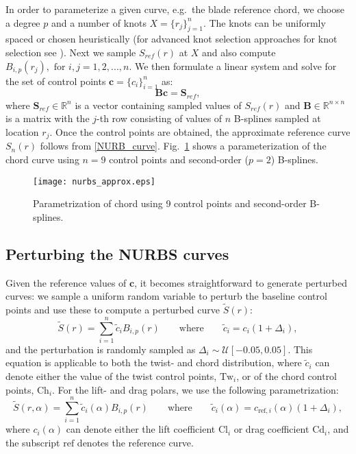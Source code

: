 In order to parameterize a given curve, e.g.\ the blade reference chord, we choose a degree $p$ and a number of knots $X =\{r_j\}_{j=1}^n$. The knots can be uniformly spaced or chosen heuristically (for advanced knot selection approaches for knot selection see \cite{Li2005}). Next we sample $S_{ref}(r)$ at $X$ and also compute $B_{i,p}(r_j), \text{ for }i, j = 1,2, ..., n$. We then formulate a linear system and solve for the set of control points $\mathbf{c}=\{c_i\}_{i=1}^n$ as:
\begin{equation}\label{nurbs_inversion}
\mathbf{B}\mathbf{c} = \mathbf{S}_{ref},
\end{equation}
where $\mathbf{S}_{ref}\in\mathbb{R}^{n}$ is a vector containing sampled values of $S_{ref}(r)$ and $\mathbf{B}\in \mathbb{R}^{n\times n}$ is a matrix with the $j$-th row consisting of values of $n$ B-splines sampled at location $r_j$. Once the control points are obtained, the approximate reference curve $S_n(r)$ follows from \eqref{NURB_curve}. Fig.~\ref{nurbs_approx} shows a parameterization of the chord curve using $n=9$ control points and second-order ($p=2$) B-splines.
\begin{figure}[h!]
\centering
\texttt{[image: nurbs\_approx.eps]}
\caption{Parametrization of chord using 9 control points and second-order B-splines.}
\label{nurbs_approx}
\end{figure}

\subsection{Perturbing the NURBS curves}
Given the reference values of $\mathbf{c}$, it becomes straightforward to generate perturbed curves: we sample a uniform random variable to perturb the baseline control points and use these to compute a perturbed curve $\tilde{S}(r)$:
\begin{equation}\label{eqn:perturb_c}
\tilde{S} (r) = \sum_{i=1}^{n} \tilde{c}_{i} B_{i,p}(r) \qquad \text{where} \qquad \tilde{c}_{i} = c_{i} (1 + \Delta_{i}),
\end{equation}
and the perturbation is randomly sampled as $\Delta_{i} \sim \mathcal{U}[-0.05,0.05]$. This equation is applicable to both the twist- and chord distribution, where $\tilde{c}_{i}$ can denote either the value of the twist control points, $\text{Tw}_i$, or of the chord control points, $\text{Ch}_{i}$. For the lift- and drag polars, we use the following parametrization:
\begin{equation}\label{eqn:perturb_cl}
\tilde{S} (r,\alpha) = \sum_{i=1}^{n} \tilde{c}_{i}(\alpha) B_{i,p}(r) \qquad \text{where} \qquad \tilde{c}_{i}(\alpha) = c_{\text{ref},i} (\alpha) (1 + \Delta_{i}),
\end{equation}
where $c_{i}(\alpha)$ can denote either the lift coefficient $\text{Cl}_{i}$ or drag coefficient $\text{Cd}_{i}$, and the subscript $\text{ref}$ denotes the reference curve. %

